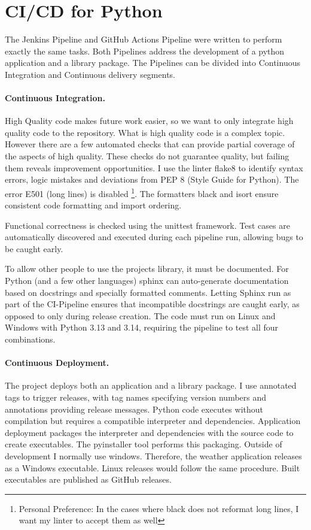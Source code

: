\documentclass{llncs}
\begin{document}
\section{CI/CD for Python}

The Jenkins Pipeline and GitHub Actions Pipeline were written to perform exactly the same tasks. Both Pipelines address the development of a python application and a library package. The Pipelines can be divided into Continuous Integration and Continuous delivery segments.

\paragraph{Continuous Integration.} High Quality code makes future work  easier, so we want to only integrate high quality code to the repository. What is high quality code is a complex topic. However there are a few automated checks that can provide partial coverage of the aspects of high quality. These checks do not guarantee quality, but failing them reveals improvement opportunities. 
I use the linter flake8 to identify syntax errors, logic mistakes and deviations from PEP 8 (Style Guide for Python). The error E501 (long lines) is disabled \footnote{Personal Preference: In the cases where black does not reformat long lines, I want my linter to accept them as well}. The formatters black and isort ensure consistent code formatting and import ordering.

Functional correctness is checked using the unittest framework. Test cases are automatically discovered and executed during each pipeline run, allowing bugs to be caught early.

To allow other people to use the projects library, it must be documented. For Python (and a few other languages) sphinx can auto-generate documentation based on docstrings and specially formatted comments. Letting Sphinx run as part of the CI-Pipeline ensures that incompatible docstrings are caught early, as opposed to only during release creation. The code must run on Linux and Windows with Python 3.13 and 3.14, requiring the pipeline to test all four combinations.

\paragraph{Continuous Deployment.} The project deploys both an application and a library package. I use annotated tags to trigger releases, with tag names specifying version numbers and annotations providing release messages.
Python code executes without compilation but requires a compatible interpreter and dependencies. Application deployment packages the interpreter and dependencies with the source code to create executables. The pyinstaller tool performs this packaging. Outside of development I normally use windows. Therefore, the weather application releases as a Windows executable. Linux releases would follow the same procedure. Built executables are published as GitHub releases.
\end{document}
